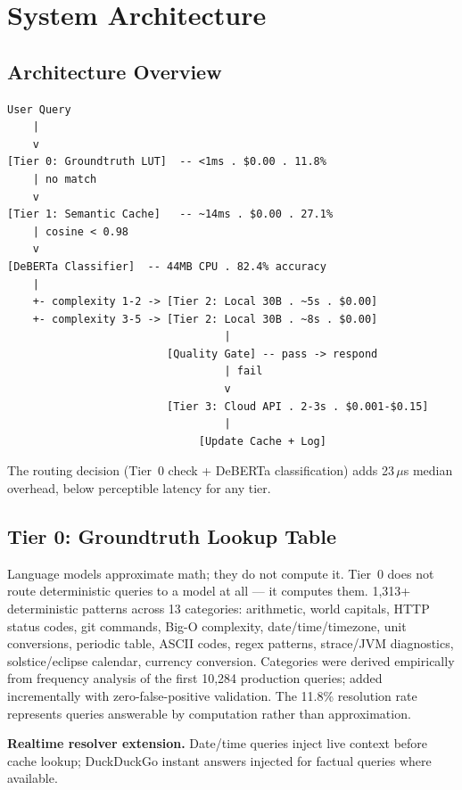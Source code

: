 \documentclass[11pt]{article}
\begin{document}
\section{System Architecture}

\subsection{Architecture Overview}

\begin{lstlisting}
User Query
    |
    v
[Tier 0: Groundtruth LUT]  -- <1ms . $0.00 . 11.8%
    | no match
    v
[Tier 1: Semantic Cache]   -- ~14ms . $0.00 . 27.1%
    | cosine < 0.98
    v
[DeBERTa Classifier]  -- 44MB CPU . 82.4% accuracy
    |
    +- complexity 1-2 -> [Tier 2: Local 30B . ~5s . $0.00]
    +- complexity 3-5 -> [Tier 2: Local 30B . ~8s . $0.00]
                                  |
                         [Quality Gate] -- pass -> respond
                                  | fail
                                  v
                         [Tier 3: Cloud API . 2-3s . $0.001-$0.15]
                                  |
                              [Update Cache + Log]
\end{lstlisting}

The routing decision (Tier~0 check + DeBERTa classification) adds
23\,$\mu$s median overhead, below perceptible latency for any tier.

\subsection{Tier 0: Groundtruth Lookup Table}

Language models approximate math; they do not compute it. Tier~0 does
not route deterministic queries to a model at all --- it computes them.
1,313+ deterministic patterns across 13 categories: arithmetic, world
capitals, HTTP status codes, git commands, Big-O complexity,
date/time/timezone, unit conversions, periodic table, ASCII codes, regex
patterns, strace/JVM diagnostics, solstice/eclipse calendar, currency
conversion. Categories were derived empirically from frequency analysis
of the first 10,284 production queries; added incrementally with
zero-false-positive validation. The 11.8\% resolution rate represents
queries answerable by computation rather than approximation.

\textbf{Realtime resolver extension.} Date/time queries inject live
context before cache lookup; DuckDuckGo instant answers injected for
factual queries where available.
\end{document}
